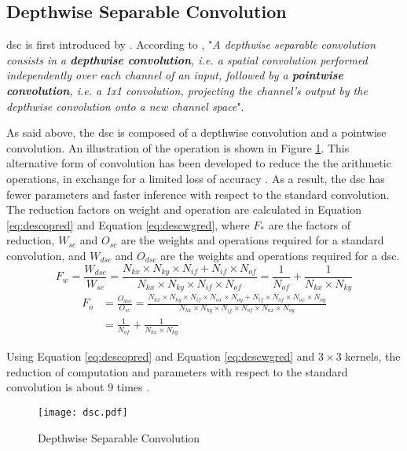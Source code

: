 \subsection{Depthwise Separable Convolution}  \label{subs:dsc}
\acrfull{dsc} is first introduced by \textcite{sifre_ecole_2014}. According to \textcite{chollet_xception_2017}, "\textit{A depthwise separable convolution consists in a \textbf{depthwise convolution}, i.e. a spatial convolution performed independently over each channel of an input, followed by a \textbf{pointwise convolution}, i.e. a 1x1 convolution, projecting the channel's output by the depthwise convolution onto a new channel space}".

As said above, the \acrshort{dsc} is composed of a depthwise convolution and a pointwise convolution. An illustration of the operation is shown in Figure \ref{fig:dsc}. This alternative form of convolution has been developed to reduce the the arithmetic operations, in exchange for a limited loss of accuracy \cite{liu_fpga-based_2019}. As a result, the \acrshort{dsc} has fewer parameters and faster inference with respect to the standard convolution. The reduction factors on weight and operation are calculated in Equation \eqref{eq:descopred} and Equation \eqref{eq:descwgred}, where $F_{*}$ are the factors of reduction, $W_{sc}$ and $O_{sc}$ are the weights and operations required for a standard convolution, and $W_{dsc}$ and $O_{dsc}$ are the weights and operations required for a \acrshort{dsc}.
%
\begin{equation}
    F_w = \frac{W_{dsc}}{W_{sc}} =
    \frac{N_{kx} \times N_{ky} \times N_{if} + N_{if} \times N_{of}}{N_{kx} \times N_{ky} \times N_{if} \times N_{of}} =
    \frac{1}{N_{of}} + \frac{1}{N_{kx} \times N_{ky}}
    \label{eq:descopred}
\end{equation}
\begin{equation}
    \begin{split}
        F_o &= \frac{O_{dsc}}{O_{sc}} = \frac{N_{kx} \times N_{ky} \times N_{if} \times N_{ox} \times N_{oy} + N_{if} \times N_{of} \times N_{ox} \times N_{oy}}{N_{kx} \times N_{ky} \times N_{if} \times N_{of} \times N_{ox} \times N_{oy}} \\
        &= \frac{1}{N_{of}} + \frac{1}{N_{kx} \times N_{ky}}
    \end{split}
    \label{eq:descwgred}
\end{equation}

Using Equation \eqref{eq:descopred} and Equation \eqref{eq:descwgred} and $3 \times 3$ kernels, the reduction of computation and parameters with respect to the standard convolution is about 9 times \cite{zhang_channel_2019}.
%
\begin{figure}
    \texttt{[image: dsc.pdf]}
    \caption{Depthwise Separable Convolution}
    \label{fig:dsc}
\end{figure}
